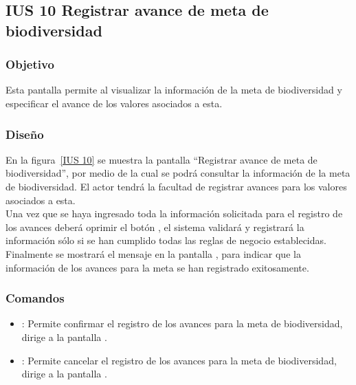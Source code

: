 \subsection{IUS 10 Registrar avance de meta de biodiversidad}

\subsubsection{Objetivo}

Esta pantalla permite al  visualizar la información de la meta de biodiversidad y especificar el avance de los valores asociados a esta.
    
\subsubsection{Diseño}

    En la figura~\ref{IUS 10} se muestra la pantalla ``Registrar avance de meta de biodiversidad'', por medio de la cual se podrá consultar la información de la meta de biodiversidad. El actor tendrá la facultad de registrar avances para los valores asociados a esta.\\
        
    Una vez que se haya ingresado toda la información solicitada para el registro de los avances deberá oprimir el botón , el sistema validará y registrará la información sólo si se han cumplido todas las reglas de negocio establecidas.\\
    
    Finalmente se mostrará el mensaje  en la pantalla , para indicar que la información de los avances para la meta se han registrado exitosamente.
        

\subsubsection{Comandos}
    \begin{itemize} 
    \item {}: Permite confirmar el registro de los avances para la meta de biodiversidad, dirige a la pantalla .
    \item {}: Permite cancelar el registro de los avances para la meta de biodiversidad, dirige a la pantalla .
    \end{itemize}

